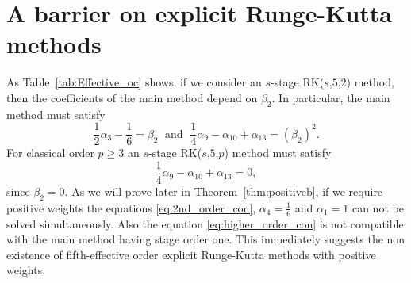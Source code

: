 \section{A barrier on explicit Runge-Kutta methods}\label{sec:ExRK_barrier}

\indent As Table~\ref{tab:Effective_oc} shows, if we consider an $s$-stage RK($s$,$5$,$2$) method, then the coefficients of the main method depend on $\beta_2$. In particular, the main method must satisfy
\begin{equation}\label{eq:2nd_order_con}
    \frac{1}{2}\alpha_3 - \frac{1}{6} = \beta_2 \; \text{ and } \; \frac{1}{4}\alpha_9 - \alpha_{10} + \alpha_{13} = (\beta_2)^2.
\end{equation}
For classical order $p \geq 3$ an $s$-stage RK($s$,$5$,$p$) method must satisfy
\begin{equation}\label{eq:higher_order_con}
    \frac{1}{4}\alpha_9- \alpha_{10} + \alpha_{13} = 0,
\end{equation}
since $\beta_2 = 0$. As we will prove later in Theorem~\ref{thm:positiveb}, if we require positive weights the equations \eqref{eq:2nd_order_con}, $\alpha_4 = \frac{1}{6}$ and $\alpha_1 = 1$ can not be solved simultaneously. Also the equation \eqref{eq:higher_order_con} is not compatible with the main method having stage order one. This immediately suggests the non existence of fifth-effective order explicit Runge-Kutta methods with positive weights.

